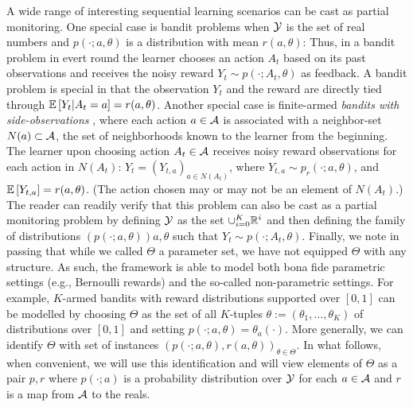 A wide range of interesting sequential learning scenarios can be cast as partial monitoring.
One special case is bandit problems when $\mathcal{Y}$ is the set of real numbers and $p(\cdot;a,\theta)$ is a distribution with mean
$r(a,\theta)$: Thus, in a bandit problem in evert round the learner chooses an action $A_t$ based on its past observations
and receives the noisy reward $Y_t \sim p(\cdot;A_t,\theta)$ as feedback. 
A bandit problem is special in that the observation $Y_t$ and the reward are directly tied through $\mathbb{E}\left[Y_t|A_t=a\right] = r(a,\theta)$.
Another special case is finite-armed  \emph{bandits with side-observations} \citet{},
where each action $a\in \mathcal{A}$ is associated with a neighbor-set $N(a)\subset \mathcal{A}$, 
the set of neighborhoods known to the learner from the beginning.
The learner upon choosing action $A_t\in \mathcal{A}$ receives noisy reward observations for each action in $N(A_t)$:
$Y_t  = (Y_{t,a})_{a\in N(A_t)}$, where $Y_{t,a} \sim p_r(\cdot;a,\theta)$, and $\mathbb{E}\left[Y_{t,a}\right] = r(a,\theta)$.
(The action chosen may or may not be an element of $N(A_t)$.)
The reader can readily verify that this problem can also be cast as a partial monitoring problem
by defining $\mathcal{Y}$ as the set $\cup_{i=0}^K \mathbb{R}^i$ and then defining 
the family of distributions $(p(\cdot;a,\theta)){a,\theta}$ such that $Y_t \sim p(\cdot;A_t,\theta)$.
Finally, we note in passing that while we called $\Theta$ a parameter set, 
we have not equipped $\Theta$ with any structure. As such,
the framework is able to model both bona fide parametric settings (e.g., Bernoulli rewards) and 
the so-called non-parametric settings. For example, $K$-armed bandits with reward distributions supported
over $[0,1]$ can be modelled by choosing $\Theta$ as the set of all $K$-tuples 
$\theta:=(\theta_1,\dots,\theta_K)$ of distributions over $[0,1]$ and setting $p(\cdot;a,\theta) = \theta_a(\cdot)$.
More generally, we can identify $\Theta$ with set of instances $(p(\cdot;a,\theta),r(a,\theta))_{\theta\in \Theta}$.
In what follows, when convenient, we will use this identification and will view elements of $\Theta$ as a pair $p,r$ 
where $p(\cdot;a)$ is a probability distribution over $\mathcal{Y}$ for each $a\in \mathcal{A}$ and $r$ is a map from $\mathcal{A}$ to the reals.
